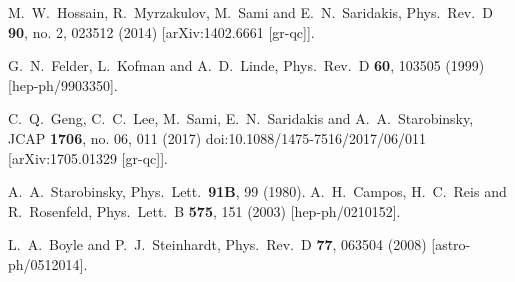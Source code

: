 \documentclass[prd,twocolumn,superscriptaddress]{revtex4}
\begin{document}
\begin{thebibliography}{99}
  M.~W.~Hossain, R.~Myrzakulov, M.~Sami and E.~N.~Saridakis,
  Phys.\ Rev.\ D {\bf 90}, no. 2, 023512 (2014)
  [arXiv:1402.6661 [gr-qc]].
  
  G.~N.~Felder, L.~Kofman and A.~D.~Linde,
  Phys.\ Rev.\ D {\bf 60}, 103505 (1999)
  [hep-ph/9903350].
  
  C.~Q.~Geng, C.~C.~Lee, M.~Sami, E.~N.~Saridakis and A.~A.~Starobinsky,
  JCAP {\bf 1706}, no. 06, 011 (2017)
  doi:10.1088/1475-7516/2017/06/011
  [arXiv:1705.01329 [gr-qc]].
  
  A.~A.~Starobinsky,
  Phys.\ Lett.\  {\bf 91B}, 99 (1980).
  A.~H.~Campos, H.~C.~Reis and R.~Rosenfeld,
  Phys.\ Lett.\ B {\bf 575}, 151 (2003)
  [hep-ph/0210152].
  
  L.~A.~Boyle and P.~J.~Steinhardt,
  Phys.\ Rev.\ D {\bf 77}, 063504 (2008)
  [astro-ph/0512014].
  
  
\end{thebibliography}


% 

% 
\end{document}
